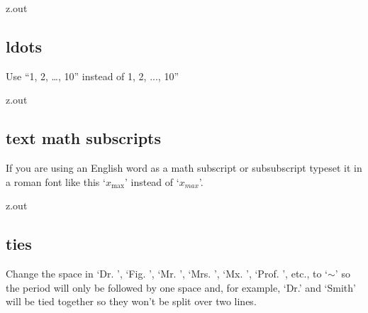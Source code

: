 \MyIO


\begin{VerbatimOut}{z.out}

\subsection{ldots}

Use ``1, 2, \ldots, 10''
instead of 1, 2, ..., 10''
\end{VerbatimOut}

\MyIO


\begin{VerbatimOut}{z.out}

\subsection{text math subscripts}

If you are using an English word
as a math subscript or subsubscript
typeset it in a roman font like this
`\(x_\text{max}\)'
instead of
`\(x_{max}\)'.
\end{VerbatimOut}

\MyIO


\begin{VerbatimOut}{z.out}

\subsection{ties}

Change the space in
`Dr. ', `Fig. ', `Mr. ', `Mrs. ', `Mx. ', `Prof. ', etc.,
to `\(\sim\)' so the period will only be followed by one
space and, for example, `Dr.' and `Smith' will be tied
together so they won't be split over two lines.
\end{VerbatimOut}

\MyIO
